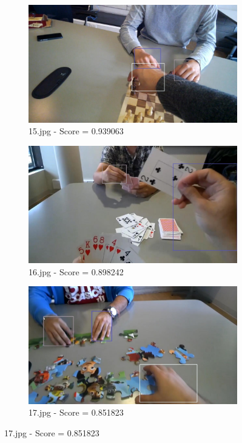 \begin{figure}[!h]
\begin{subfigure}[b]{0.3\textwidth}
    \end{subfigure}
    \hfill
    \begin{subfigure}[b]{0.3\textwidth}
        \centering
        \includegraphics[width=\textwidth]{images/handDetection/15.jpg}
        \caption{15.jpg - Score = 0.939063}
       
    \end{subfigure}

    \begin{subfigure}[b]{0.3 \textwidth}
        \centering
        \includegraphics[width=\textwidth]{images/handDetection/16.jpg}
        \caption{16.jpg - Score = 0.898242}
        
    \end{subfigure}
    \hfill
    \begin{subfigure}[b]{0.3\textwidth}
        \centering
        \includegraphics[width=\textwidth]{images/handDetection/17.jpg}
        \caption{17.jpg - Score = 0.851823}
        

\end{subfigure}
\end{figure}
